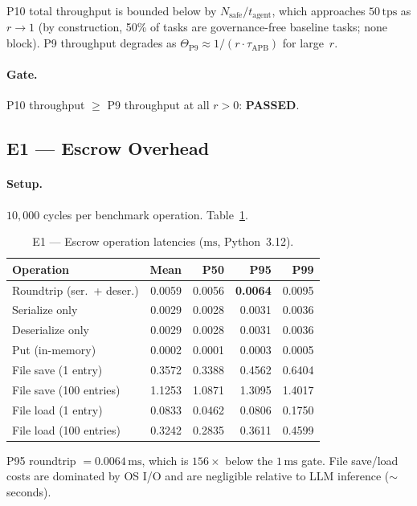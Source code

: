 \documentclass[11pt]{article}
\begin{document}
P10 total throughput is bounded below by $N_{\mathrm{safe}}/t_{\mathrm{agent}}$,
which approaches $50\,\text{tps}$ as $r \to 1$ (by construction, 50\% of
tasks are governance-free baseline tasks; none block). P9 throughput degrades as
$\Theta_{\mathrm{P9}} \approx 1/(r \cdot \tau_{\mathrm{APB}})$ for large~$r$.

\paragraph{Gate.} P10 throughput $\ge$ P9 throughput at all $r > 0$:
\textbf{PASSED}.

\subsection{E1 --- Escrow Overhead}

\paragraph{Setup.} $10{,}000$ cycles per benchmark operation. Table~\ref{tab:e1}.

\begin{table}[h]
\centering
\caption{E1 --- Escrow operation latencies ($\si{\milli\second}$, Python~3.12).}
\label{tab:e1}
\begin{tabular}{lrrrr}
\toprule
Operation & Mean & P50 & P95 & P99 \\
\midrule
Roundtrip (ser.\ + deser.) & 0.0059 & 0.0056 & \textbf{0.0064} & 0.0095 \\
Serialize only              & 0.0029 & 0.0028 & 0.0031 & 0.0036 \\
Deserialize only            & 0.0029 & 0.0028 & 0.0031 & 0.0036 \\
Put (in-memory)             & 0.0002 & 0.0001 & 0.0003 & 0.0005 \\
\midrule
File save (1 entry)         & 0.3572 & 0.3388 & 0.4562 & 0.6404 \\
File save (100 entries)     & 1.1253 & 1.0871 & 1.3095 & 1.4017 \\
File load (1 entry)         & 0.0833 & 0.0462 & 0.0806 & 0.1750 \\
File load (100 entries)     & 0.3242 & 0.2835 & 0.3611 & 0.4599 \\
\bottomrule
\end{tabular}
\end{table}

P95 roundtrip $= 0.0064\,\si{\milli\second}$, which is $156\times$ below
the $1\,\si{\milli\second}$ gate. File save/load costs are dominated
by OS I/O and are negligible relative to LLM inference
($\sim$seconds).
\end{document}
